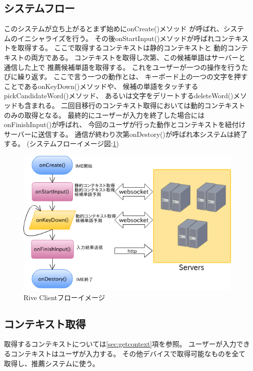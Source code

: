 \subsection{システムフロー}
このシステムが立ち上がるとまず始めにonCreate()メソッド
が呼ばれ、システムのイニシャライズを行う。
その後onStartInput()メソッドが呼ばれコンテキストを取得する。
ここで取得するコンテキストは静的コンテキストと
動的コンテキストの両方である。
コンテキストを取得し次第、この候補単語はサーバーと通信した上で
推薦候補単語を取得する。
これをユーザーが一つの操作を行うたびに繰り返す。
ここで言う一つの動作とは、
キーボード上の一つの文字を押すことであるonKeyDown()メソッドや、
候補の単語をタッチするpickCandidateWord()メソッド、
あるいは文字をデリートするdeleteWord()メソッドも含まれる。
二回目移行のコンテキスト取得においては動的コンテキストのみの取得となる。
最終的にユーザーが入力を終了した場合にはonFinishInput()が呼ばれ、
今回のユーザが行った動作とコンテキストを紐付けサーバーに送信する。
通信が終わり次第onDestory()が呼ばれ本システムは終了する。
(システムフローイメージ図:\ref{fig:clientflow})
\begin{figure}[htbp]
  \begin{center}
    \includegraphics[width=140mm,bb=0 0 562 366]{images/clientflow}
  \end{center}
  \caption{Rive Clientフローイメージ}
  \label{fig:clientflow}
\end{figure}

\subsection{コンテキスト取得}
取得するコンテキストについては\ref{sec:getcontext}項を参照。
ユーザーが入力できるコンテキストはユーザが入力する。
その他デバイスで取得可能なものを全て取得し、推薦システムに使う。


